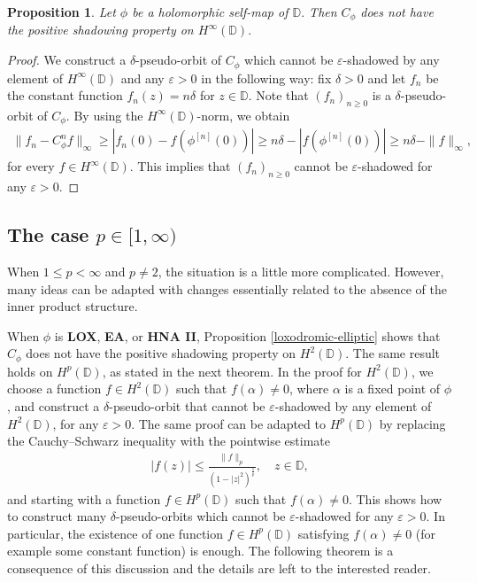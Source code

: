 \documentclass[11pt]{amsart}
\theoremstyle{plain}
\newtheorem{proposition}[definition]{Proposition}
\theoremstyle{remark}
\theoremstyle{plain}
\begin{document}
\begin{proposition} Let $\phi$ be a holomorphic self-map of $\mathbb{D}.$ Then $C_\phi$ does not have the positive shadowing property on $H^{\infty}(\mathbb{D}).$ 
\end{proposition}
\begin{proof} We construct a $\delta$-pseudo-orbit of $C_{\phi}$ which cannot be $\varepsilon$-shadowed by any element of $H^{\infty}(\mathbb{D})$ and any $\varepsilon>0$ in the following way: fix $\delta > 0$ and let $f_n$ be the constant function  $f_n (z) =  n \delta$ for $ z\in \mathbb{D}.$ Note that $(f_n)_{n\geq 0}$ is a $\delta$-pseudo-orbit of $C_{\phi}.$ By using the $H^{\infty}(\mathbb{D})$-norm, we obtain
\begin{align*}
\|f_n-C_{\phi}^nf\|_{\infty} \geq |f_n(0)-f(\phi^{[n]}(0))|\geq n\delta-|f(\phi^{[n]}(0))|\geq n\delta -\|f\|_{\infty},
\end{align*}
for every $f\in H^{\infty}(\mathbb{D}).$ This implies that $(f_n)_{n \geq 0}$ cannot be $\varepsilon$-shadowed for any $\varepsilon>0$.
\end{proof}

\subsection{The case $p \in [1,\infty)$}


When $1 \leq p < \infty$ and $p \neq 2$, the situation is a little more complicated. However, many ideas can be adapted with changes essentially related to the absence of the inner product structure. 

When $\phi$ is \textbf{LOX}, \textbf{EA}, or \textbf{HNA II}, Proposition \ref{loxodromic-elliptic} shows that $C_{\phi}$ does not have the positive shadowing property on $H^2(\mathbb{D})$. The same result holds on $H^p(\mathbb{D})$, as stated in the next theorem. In the proof for $H^2(\mathbb{D})$, we choose a function $f\in H^2(\mathbb{D})$ such that $f(\alpha)\neq 0$, where $\alpha$ is a fixed point of $\phi$, and construct a $\delta$-pseudo-orbit that cannot be $\varepsilon$-shadowed by any element of $H^2(\mathbb{D})$, for any $\varepsilon>0$. The same proof can be adapted to $H^p(\mathbb{D})$ by replacing the Cauchy--Schwarz inequality with the pointwise estimate
\begin{align}\label{pointwiseHp}
    |f(z)| \leq \frac{\|f\|_{p}}{(1 - |z|^2)^{\frac{1}{p}}}, \quad z\in \mathbb{D},
\end{align}
and starting with a function $f \in H^p(\mathbb{D})$ such that $f(\alpha) \neq 0$. This shows how to construct many $\delta$-pseudo-orbits which cannot be $\varepsilon$-shadowed for any $\varepsilon > 0$. In particular, the existence of one function $f \in H^p(\mathbb{D})$ satisfying $f(\alpha) \neq 0$ (for example some constant function) is enough. The following theorem is a consequence of this discussion and the details are left to the interested reader.
\end{document}
